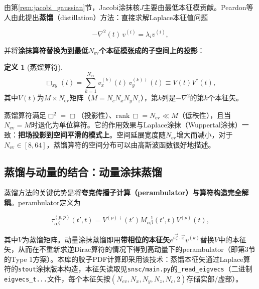 \documentclass[12pt,a4paper]{ctexart}
\theoremstyle{definition}
\newtheorem{definition}{定义}[section]
\begin{document}
由第\ref{rem:jacobi_gaussian}节，Jacobi涂抹核$J$主要由最低本征模贡献。Peardon等人\cite{Peardon2009}由此提出\textbf{蒸馏}（distillation）方法：直接求解Laplace本征值问题

\begin{equation}
-\nabla^2(t)\, v^{(i)} = \lambda_i v^{(i)},
\label{eq:eigenvalue}
\end{equation}

并将\textbf{涂抹算符替换为到最低$N_{\text{ev}}$个本征模张成的子空间上的投影}：

\begin{definition}[蒸馏算符]
\begin{equation}
\boxed{\Box_{xy}(t) = \sum_{k=1}^{N_{\text{ev}}} v^{(k)}_x(t)\, v^{(k)\dagger}_y(t) \equiv V(t)V^\dagger(t)},
\label{eq:distillation_operator}
\end{equation}
其中$V(t)$为$M \times N_{\text{ev}}$矩阵（$M = N_c N_x N_y N_z$），第$k$列是$-\nabla^2$的第$k$个本征矢。
\end{definition}

蒸馏算符满足$\Box^2 = \Box$（投影性）、$\mathrm{rank}\,\Box = N_{\text{ev}} \ll M$（低秩性），且当$N_{\text{ev}} = M$时退化为单位算符。它的作用效果与Laplace涂抹（Wuppertal涂抹）一致：\textbf{把场投影到空间平滑的模式上}。空间延展宽度随$N_{\text{ev}}$增大而减小，对于$N_{\text{ev}} \in [8, 64]$，蒸馏算符的空间分布可以由高斯波函数很好地描述\cite{Peardon2009}。

\subsection{蒸馏与动量的结合：动量涂抹蒸馏}

蒸馏方法的关键优势是将\textbf{夸克传播子计算（perambulator）与算符构造完全解耦}\cite{Peardon2009,Egerer2021a}。perambulator定义为

\begin{equation}
\tau^{(p,\bar p)}_{\alpha\beta}(t', t) = V^{(p)\dagger}(t') M^{-1}_{\alpha\beta}(t', t) V^{(\bar p)}(t),
\label{eq:perambulator}
\end{equation}

其中$V$为蒸馏矩阵。动量涂抹蒸馏即用\textbf{带相位的本征矢}$e^{i\vec{\zeta}\cdot\vec{x}}v^{(k)}$替换$V$中的本征矢，从而在不重新求逆Dirac算符的情况下得到高动量下的perambulator（即第3节的Type 1方案）。本库的胶子PDF计算即采用该技术：蒸馏本征矢通过Laplace算符的\texttt{stout}涂抹版本构造\cite{Egerer2021a}，本征矢读取见\texttt{snsc/main.py}的\texttt{\_read\_eigvecs}（二进制\texttt{eigvecs\_t...}文件，每个本征矢按$(N_{ev}, N_x,N_y,N_z, N_c, 2)$存储实部/虚部）。
\end{document}
